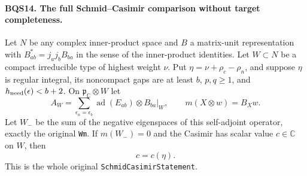 \documentclass[11pt,a4paper]{article}
\numberwithin{equation}{section}
\theoremstyle{remark}\newtheorem{remark}[theorem]{Remark}
\begin{document}
\paragraph{BQS14. The full Schmid--Casimir comparison without target completeness.}
\label{claim:BQS14}
Let $N$ be any complex inner-product space and $B$ a matrix-unit
representation with
$B_{ab}^*=j_aj_bB_{ba}$ in the sense of the inner-product identities.
Let $W\subset N$ be a compact irreducible type of highest weight $\nu$.
Put
$\eta=\nu+\rho_c-\rho_n$, and suppose $\eta$ is regular integral,
its noncompact gaps are at least $b$, $p,q\ge1$, and
$h_{\rm need}(\epsilon)<b+2$.
On $\mathfrak p_{\mathbb C}\otimes W$ let
\[
 A_W=\sum_{\epsilon_a=\epsilon_b}
           \operatorname{ad}(E_{ab})\otimes B_{ba}|_W,\qquad
 m(X\otimes w)=B_Xw.
 \tag{BQS.35}
\]
Let $W_-$ be the sum of the negative eigenspaces of this self-adjoint
operator, exactly the original \texttt{Wm}.
If $m(W_-)=0$ and the Casimir has scalar value $c\in\mathbb C$
on $W$, then
\[
                               c=c(\eta).
 \tag{BQS.36}
\]
This is the whole original \texttt{Schmid\allowbreak Casimir\allowbreak Statement}.
\end{document}
